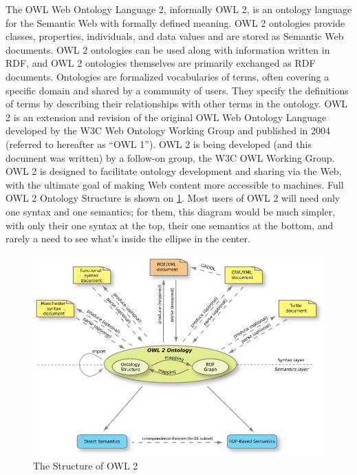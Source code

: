 \documentclass[thesis=M,english,hidelinks]{FITthesis}[2019/12/23]
\begin{document}
The \gls{OWL} Web Ontology Language 2, informally \gls{OWL} 2, is an ontology language for the Semantic Web with formally defined meaning. \gls{OWL} 2 ontologies provide classes, properties, individuals, and data values and are stored as Semantic Web documents. OWL 2 ontologies can be used along with information written in RDF, and \gls{OWL} 2 ontologies themselves are primarily exchanged as RDF documents. Ontologies are formalized vocabularies of terms, often covering a specific domain and shared by a community of users. They specify the definitions of terms by describing their relationships with other terms in the ontology. \gls{OWL} 2 is an extension and revision of the original OWL Web Ontology Language developed by the W3C Web Ontology Working Group and published in 2004 (referred to hereafter as “OWL 1”)\cite{owl_reference}. OWL 2 is being developed (and this document was written) by a follow-on group, the W3C OWL Working Group. \gls{OWL} 2 is designed to facilitate ontology development and sharing via the Web, with the ultimate goal of making Web content more accessible to machines. Full OWL 2 Ontology Structure is shown on \ref{fig:owl2structure}. Most users of OWL 2 will need only one syntax and one semantics; for them, this diagram would be much simpler, with only their one syntax at the top, their one semantics at the bottom, and rarely a need to see what's inside the ellipse in the center.\cite{owl_overview}

\begin{figure}
	\centering
	\includegraphics[width=1.0\linewidth]{owl2_structure}
	\caption{The Structure of OWL 2}
	\label{fig:owl2structure}
\end{figure}
\end{document}
